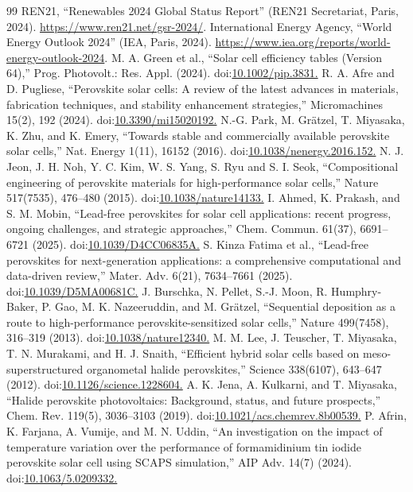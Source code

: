 \documentclass[aip,jap,amsmath,amssymb,preprint]{revtex4-2}
\begin{document}
\begin{thebibliography}{99}
 REN21, ``Renewables 2024 Global Status Report'' (REN21 Secretariat, Paris, 2024). \url{https://www.ren21.net/gsr-2024/}.
 International Energy Agency, ``World Energy Outlook 2024'' (IEA, Paris, 2024). \url{https://www.iea.org/reports/world-energy-outlook-2024}.
 M. A. Green et al., ``Solar cell efficiency tables (Version 64),'' Prog. Photovolt.: Res. Appl. (2024). doi:\url{10.1002/pip.3831.}
 R. A. Afre and D. Pugliese, ``Perovskite solar cells: A review of the latest advances in materials, fabrication techniques, and stability enhancement strategies,'' Micromachines 15(2), 192 (2024). doi:\url{10.3390/mi15020192.}
 N.-G. Park, M. Grätzel, T. Miyasaka, K. Zhu, and K. Emery, ``Towards stable and commercially available perovskite solar cells,'' Nat. Energy 1(11), 16152 (2016). doi:\url{10.1038/nenergy.2016.152.}
 N. J. Jeon, J. H. Noh, Y. C. Kim, W. S. Yang, S. Ryu and S. I. Seok, ``Compositional engineering of perovskite materials for high-performance solar cells,'' Nature 517(7535), 476--480 (2015). doi:\url{10.1038/nature14133.}
 I. Ahmed, K. Prakash, and S. M. Mobin, ``Lead-free perovskites for solar cell applications: recent progress, ongoing challenges, and strategic approaches,'' Chem. Commun. 61(37), 6691--6721 (2025). doi:\url{10.1039/D4CC06835A.}
 S. Kinza Fatima et al., ``Lead-free perovskites for next-generation applications: a comprehensive computational and data-driven review,'' Mater. Adv. 6(21), 7634--7661 (2025). doi:\url{10.1039/D5MA00681C.}
 J. Burschka, N. Pellet, S.-J. Moon, R. Humphry-Baker, P. Gao, M. K. Nazeeruddin, and M. Grätzel, ``Sequential deposition as a route to high-performance perovskite-sensitized solar cells,'' Nature 499(7458), 316--319 (2013). doi:\url{10.1038/nature12340.}
 M. M. Lee, J. Teuscher, T. Miyasaka, T. N. Murakami, and H. J. Snaith, ``Efficient hybrid solar cells based on meso-superstructured organometal halide perovskites,'' Science 338(6107), 643--647 (2012). doi:\url{10.1126/science.1228604.}
 A. K. Jena, A. Kulkarni, and T. Miyasaka, ``Halide perovskite photovoltaics: Background, status, and future prospects,'' Chem. Rev. 119(5), 3036--3103 (2019). doi:\url{10.1021/acs.chemrev.8b00539.}
 P. Afrin, K. Farjana, A. Vumije, and M. N. Uddin, ``An investigation on the impact of temperature variation over the performance of formamidinium tin iodide perovskite solar cell using SCAPS simulation,'' AIP Adv. 14(7) (2024). doi:\url{10.1063/5.0209332.}

\end{thebibliography}
\end{document}
